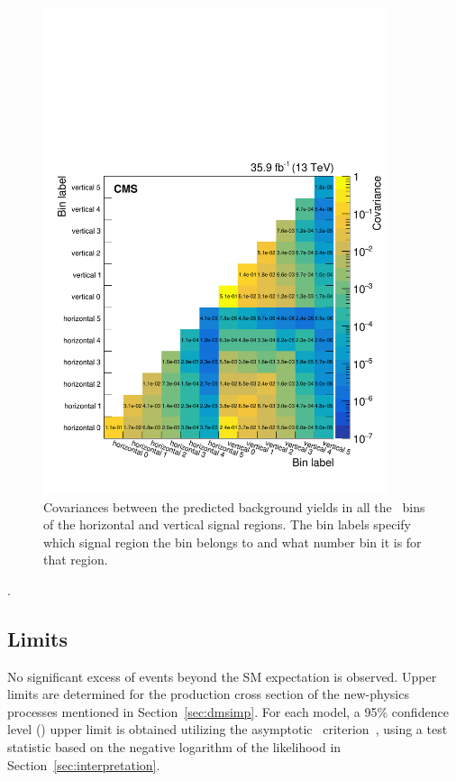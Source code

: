 \begin{figure}[hbtp]
  \centering
  \includegraphics[width=0.9\textwidth]{Analysis/Figures/correlation_matrix.pdf}
  \caption{
    Covariances between the predicted background yields in all the \ETg\ bins of the horizontal and vertical signal regions.
    The bin labels specify which signal region the bin belongs to and what number bin it is for that region.}
  \label{fig:correlation_matrix}
\end{figure}.

\subsection{Limits}
\label{sec:limits}

No significant excess of events beyond the SM expectation is observed. 
Upper limits are determined for the production cross section of the new-physics processes mentioned in Section~\ref{sec:dmsimp}. 
For each model, a 95\% confidence level (\CL) upper limit is obtained utilizing the asymptotic \CLs\ criterion~\cite{Junk:1999kv,Read:2002hq,Cowan:2010js}, using a test statistic based on the negative logarithm of the likelihood in Section~\ref{sec:interpretation}.

